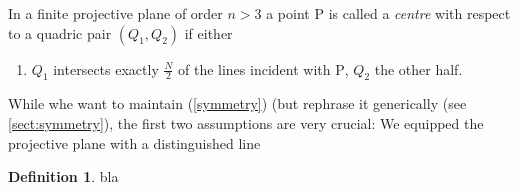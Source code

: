 \documentclass[12pt,english,paper=a4,DIV=12,headings=small,numbers=noenddot,parskip=half]{scrartcl}
\theoremstyle{definition}
\newtheorem{defi}{Definition}[section]
\begin{document}
In a finite projective plane of order $n>3$ a point $\mathrm{P}$ is called a \emph{centre} with respect to a quadric pair $(Q_1,Q_2)$ if either
\begin{enumerate}[{i}a]
\item{$Q_1$ intersects exactly $\frac{N}{2}$ of the lines incident with $\mathrm{P}$, $Q_2$ the other half. }
\end{enumerate}

While whe want to maintain (\ref{symmetry}) (but rephrase it generically (see \ref{sect:symmetry}), the first two assumptions are very crucial: We equipped the projective plane with a distinguished line

\begin{defi}
bla
\end{defi}
\end{document}
